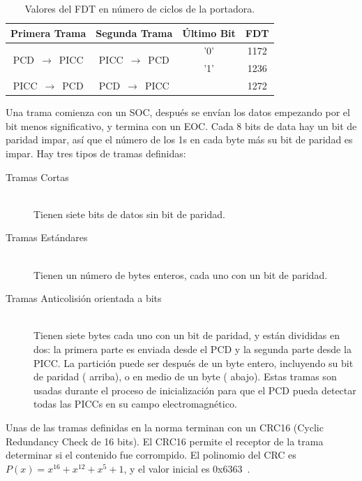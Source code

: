 \documentclass[a4paper, twoside, 11pt]{report}
\begin{document}
\begin{table}[htb]
  \centering
  \begin{tabular}{|c|c|c|c|}
    \hline
    \textbf{Primera Trama} & \textbf{Segunda Trama} & \textbf{Último Bit} & \textbf{FDT} \\
    \hline
    \multirow{2}{*}{PCD~$\rightarrow$~PICC} & \multirow{2}{*}{PICC~$\rightarrow$~PCD} & '0' & 1172  \\
    \cline{3-4}
    & & '1' & 1236 \\
    \hline
    PICC~$\rightarrow$~PCD & PCD~$\rightarrow$~PICC & & 1272 \\
    \hline
  \end{tabular}
  \caption{Valores del FDT en número de ciclos de la portadora.}
  \label{tab:fdt}
\end{table}

Una trama comienza con un SOC, después se envían los datos empezando por el bit menos significativo, y termina con un EOC. Cada 8 bits de data hay un bit de paridad impar, así que el número de los 1s en cada byte más su bit de paridad es impar. Hay tres tipos de tramas definidas:

\begin{description}
  \item [Tramas Cortas] \hfill \\ Tienen siete bits de datos sin bit de paridad.
  \item[Tramas Estándares] \hfill \\ Tienen un número de bytes enteros, cada uno con un bit de paridad.
  \item[Tramas Anticolisión orientada a bits] \hfill \\ Tienen siete bytes cada uno con un bit de paridad, y están divididas en dos: la primera parte es enviada desde el PCD y la segunda parte desde la PICC. La partición puede ser después de un byte entero, incluyendo su bit de paridad ( arriba), o en medio de un byte ( abajo). Estas tramas son usadas durante el proceso de inicialización para que el PCD pueda detectar todas las PICCs en su campo electromagnético.
\end{description}

Unas de las tramas definidas en la norma terminan con un CRC16 (Cyclic Redundancy Check de 16 bits). El CRC16 permite el receptor de la trama determinar si el contenido fue corrompido. El polinomio del CRC es $P\left(x\right) = x^{16} + x^{12} + x^{5} + 1$, y el valor inicial es 0x6363~\cite{iso14443-3}\cite{iso13239}.
\end{document}
